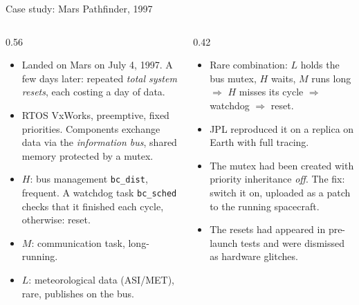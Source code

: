 \begin{frame}{Case study: Mars Pathfinder, 1997}
  \begin{columns}[T]
    \begin{column}{0.56\textwidth}
      \small
      \begin{itemize}
        \item Landed on Mars on July 4, 1997. A few days later: repeated \emph{total system resets}, each costing a day of data.
        \item RTOS VxWorks, preemptive, fixed priorities. Components exchange data via the \emph{information bus}, shared memory protected by a mutex.
        \item $H$: bus management \texttt{bc\_dist}, frequent. A watchdog task \texttt{bc\_sched} checks that it finished each cycle, otherwise: reset.
        \item $M$: communication task, long-running.
        \item $L$: meteorological data (ASI/MET), rare, publishes on the bus.
      \end{itemize}
    \end{column}
    \begin{column}{0.42\textwidth}
      \small
      \begin{itemize}
        \item Rare combination: $L$ holds the bus mutex, $H$ waits, $M$ runs long $\Rightarrow$ $H$ misses its cycle $\Rightarrow$ watchdog $\Rightarrow$ reset.
        \item JPL reproduced it on a replica on Earth with full tracing.
        \item The mutex had been created with priority inheritance \emph{off}. The fix: switch it on, uploaded as a patch to the running spacecraft.
        \item The resets had appeared in pre-launch tests and were dismissed as hardware glitches.
      \end{itemize}
    \end{column}
  \end{columns}
\end{frame}


